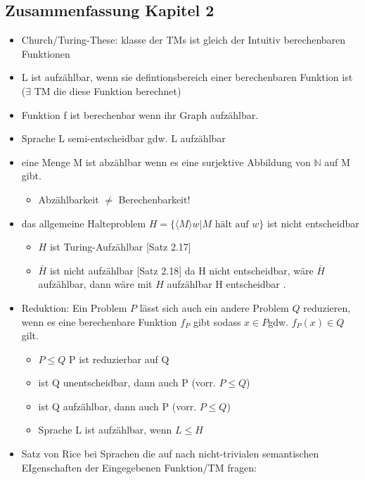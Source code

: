 \documentclass[a4paper, 10pt]{article}
\theoremstyle{definition}
\newcommand{\goedl}[1]{\langle {#1}\rangle}
\begin{document}
\subsection{Zusammenfassung Kapitel 2}
\begin{itemize}
    \item Church/Turing-These: klasse der TMs ist gleich der Intuitiv berechenbaren Funktionen
    \item L ist aufzählbar, wenn sie defintionsbereich einer berechenbaren Funktion ist ($\exists$ TM die diese Funktion berechnet)
    \item Funktion f ist berechenbar wenn ihr Graph aufzählbar.
    \item Sprache L semi-entscheidbar gdw. L aufzählbar
    \item eine Menge M ist abzählbar wenn es eine surjektive Abbildung von $\mathbb{N}$ auf M gibt.\begin{itemize}
        \item Abzählbarkeit $\neq$ Berechenbarkeit!
    \end{itemize}
    \item das allgemeine Halteproblem $H=\{\goedl{M}w|M\text{ hält auf }w\}$ ist nicht entscheidbar\begin{itemize}
        \item $H$ ist Turing-Aufzählbar [Satz 2.17]
        \item $\bar{H}$ ist nicht aufzählbar [Satz 2.18] da H nicht entscheidbar, wäre $\bar{H}$ aufzählbar, dann wäre mit $H$ aufzählbar H entscheidbar \Lightning.
    \end{itemize}
    \item Reduktion: Ein Problem $P$ lässt sich auch ein andere Problem $Q$ reduzieren, wenn es eine berechenbare Funktion $f_P$ gibt sodass $x\in P $gdw. $f_P(x)\in Q$ gilt.\begin{itemize}
        \item $P\leq Q$ P ist reduzierbar auf Q
        \item ist Q unentscheidbar, dann auch P (vorr. $P\leq Q$)
        \item ist Q aufzählbar, dann auch P (vorr. $P\leq Q$)
        \item Sprache L ist aufzählbar, wenn $L\leq H$
    \end{itemize}
    \item Satz von Rice bei Sprachen die auf nach nicht-trivialen semantischen EIgenschaften der Eingegebenen Funktion/TM fragen:\begin{itemize}

\end{itemize}
\end{itemize}
\end{document}
